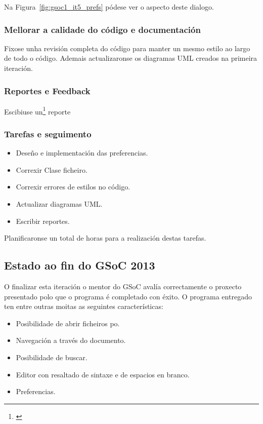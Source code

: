 Na Figura~\ref{fig:gsoc1_it5_prefs} pódese ver o aspecto deste dialogo.

\subsubsection{Mellorar a calidade do código e documentación}
Fixose unha revisión completa do código para manter un mesmo estilo ao largo de todo o código. Ademais actualizaronse os diagramas UML creados na primeira iteración.

\subsubsection{Reportes e Feedback}
Escibiuse un\footnote{\href{}{}} reporte

\subsubsection{Tarefas e seguimento}

\begin {itemize}
  \item Deseño e implementación das preferencias.
  \item Correxir Clase ficheiro.
  \item Correxir errores de estilos no código.
  \item Actualizar diagramas UML.
  \item Escribir reportes.
\end {itemize}

Planificaronse un total de  horas para a realización destas tarefas.

\subsection{Estado ao fin do GSoC 2013}
O finalizar esta iteración o mentor do GSoC avalía correctamente o proxecto presentado polo que o programa é completado con éxito. O programa entregado ten entre outras moitas as seguintes características:

\begin{itemize}
  \item Posibilidade de abrir ficheiros po.
  \item Navegación a través do documento.
  \item Posibilidade de buscar.
  \item Editor con resaltado de sintaxe e de espacios en branco.
  \item Preferencias.
\end{itemize}

